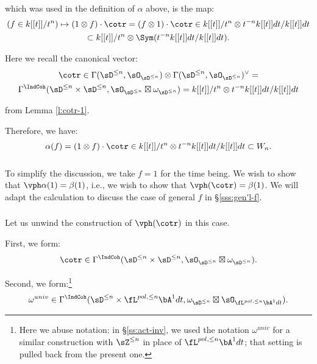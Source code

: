  which was used in the definition of $\alpha$ above,
is the map:
%
\[
\begin{gathered}
(f \in k[[t]]/t^n) \mapsto (1 \otimes f) \cdot \cotr = (f \otimes 1) \cdot \cotr
\in k[[t]]/t^n \otimes t^{-n}k[[t]]dt/k[[t]]dt \\ \subset
k[[t]]/t^n \otimes \Sym(t^{-n}k[[t]]dt/k[[t]]dt).
\end{gathered}
\]

 Here we recall the canonical vector:
%
\[
\begin{gathered}
\cotr \in
\Gamma(\sD^{\leq n},\sO_{\sD^{\leq n}}) \otimes
\Gamma(\sD^{\leq n},\sO_{\sD^{\leq n}})^{\vee} = \\
\Gamma^{\IndCoh}(\sD^{\leq n} \times \sD^{\leq n},
\sO_{\sD^{\leq n}} \boxtimes \omega_{\sD^{\leq n}}) =
k[[t]]/t^n \otimes t^{-n}k[[t]]dt/k[[t]]dt
\end{gathered}
\]

 from Lemma \ref{l:cotr-1}.

Therefore, we have:
%
\[
\alpha(f) = (1 \otimes f) \cdot \cotr \in
k[[t]]/t^n \otimes t^{-n}k[[t]]dt/k[[t]]dt \subset W_n.
\]

\subsubsection{}

To simplify the discussion, we take $f = 1$ for the time being.
We wish to show that $\vph\alpha(1) = \beta(1)$, i.e., we wish
to show that $\vph(\cotr) = \beta(1)$.
We will adapt the calculation to discuss the
case of general $f$ in \S \ref{sss:gen'l-f}.

\subsubsection{}

Let us unwind the construction of $\vph(\cotr)$ in this case.

First, we form:
%
\[
\cotr \in \Gamma^{\IndCoh}(\sD^{\leq n} \times \sD^{\leq n},
\sO_{\sD^{\leq n}} \boxtimes \omega_{\sD^{\leq n}}).
\]

 Second, we form:\footnote{Here we abuse notation: in \S \ref{ss:act-inv}, we used the
notation $\omega^{univ}$ for a similar construction with $\sZ^{\leq n}$ in place of
$\fL^{pol,\leq n} \bA^1 dt$; that setting is pulled back from the present
one.}
%
\[
\omega^{univ} \in \Gamma^{\IndCoh}(\sD^{\leq n} \times
\fL^{pol,\leq n} \bA^1 dt,
\omega_{\sD^{\leq n}} \boxtimes \sO_{\fL^{pol,\leq n} \bA^1 dt}).
\]

